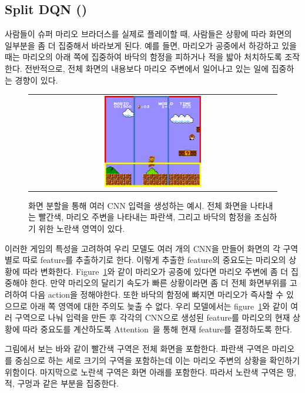 \subsection{Split DQN (\sdqnname)}
\label{sec:method:sdqn}
사람들이 슈퍼 마리오 브라더스를 실제로 플레이할 때, 사람들은 상황에 따라 화면의 일부분을 좀 더 집중해서 바라보게 된다.
예를 들면, 마리오가 공중에서 하강하고 있을 때는 마리오의 아래 쪽에 집중하여 바닥의 함정을 피하거나 적을 밟아 처치하도록 조작한다.
전반적으로, 전체 화면의 내용보다 마리오 주변에서 일어나고 있는 일에 집중하는 경향이 있다.
%
\begin{figure}[h]
\begin{center}
\begin{tabular}{c}
     \includegraphics[width=0.4\textwidth]{FIG/split_screen.pdf} \\
\end{tabular}
\caption{
	화면 분할을 통해 여러 CNN 입력을 생성하는 예시. 전체 화면을 나타내는 빨간색, 마리오 주변을 나타내는 파란색, 그리고 바닥의 함정을 조심하기 위한 노란색 영역이 있다.
}
\label{fig:split_screen}
\end{center}
\end{figure}
%
이러한 게임의 특성을 고려하여 우리 모델도 여러 개의 CNN을 만들어 화면의 각 구역별로 따로 feature를 추출하기로 한다.
이렇게 추출한 feature의 중요도는 마리오의 상황에 따라 변화한다. Figure~\ref{fig:split_screen}와 같이 마리오가 공중에 있다면 마리오 주변에 좀 더 집중해야 한다.
만약 마리오의 달리기 속도가 빠른 상황이라면 좀 더 전체 화면부위를 고려하여 다음 action을 정해야한다.
또한 바닥의 함정에 빠지면 마리오가 즉사할 수 있으므로 아래 쪽 영역에 대한 주의도 늦출 수 없다.
우리 모델에서는 figure~\ref{fig:split_screen}와 같이 여러 구역으로 나눠 입력을 만든 후 각각의 CNN으로 생성된 feature를 마리오의 현재 상황에 따라 중요도를 계산하도록 Attention~\cite{Attention}을 통해 현재 feature를 결정하도록 한다.

그림에서 보는 바와 같이 빨간색 구역은 전체 화면을 포함한다. 
파란색 구역은 마리오를 중심으로 하는 세로 크기의 구역을 포함하는데 이는 마리오 주변의 상황을 확인하기 위함이다.
마지막으로 노란색 구역은 화면 아래를 포함한다. 
따라서 노란색 구역은 땅, 적, 구멍과 같은 부분을 집중한다. 

